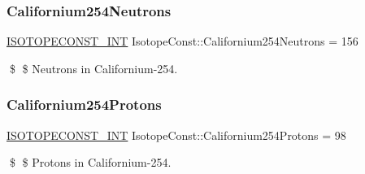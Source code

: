 \subsubsection{\texorpdfstring{Californium254\+Neutrons}{Californium254Neutrons}}
{\footnotesize\ttfamily \mbox{\hyperlink{group___isotope_const-_macros_ga5f18360b3e99483a35c32d789e62621c}{I\+S\+O\+T\+O\+P\+E\+C\+O\+N\+S\+T\+\_\+\+I\+NT}} Isotope\+Const\+::\+Californium254\+Neutrons = 156}

\$ \$ Neutrons in Californium-\/254. \mbox{\label{group___isotope_const-_californium-_cf254_ga28959ec5181347d129c244cd2857908b}} 
\subsubsection{\texorpdfstring{Californium254\+Protons}{Californium254Protons}}
{\footnotesize\ttfamily \mbox{\hyperlink{group___isotope_const-_macros_ga5f18360b3e99483a35c32d789e62621c}{I\+S\+O\+T\+O\+P\+E\+C\+O\+N\+S\+T\+\_\+\+I\+NT}} Isotope\+Const\+::\+Californium254\+Protons = 98}

\$ \$ Protons in Californium-\/254. 